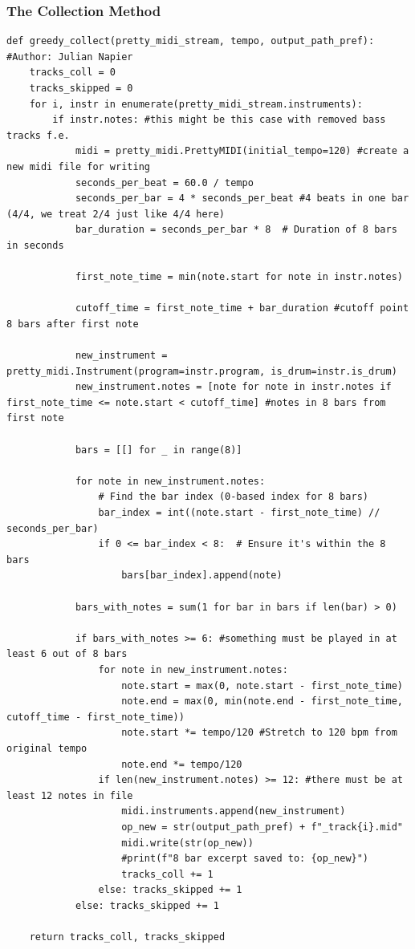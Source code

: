 \documentclass[a4paper,12pt]{extarticle}
\begin{document}
\subsubsection{The Collection Method}
\begin{lstlisting}
def greedy_collect(pretty_midi_stream, tempo, output_path_pref):
#Author: Julian Napier
    tracks_coll = 0
    tracks_skipped = 0
    for i, instr in enumerate(pretty_midi_stream.instruments):
        if instr.notes: #this might be this case with removed bass tracks f.e.
            midi = pretty_midi.PrettyMIDI(initial_tempo=120) #create a new midi file for writing
            seconds_per_beat = 60.0 / tempo
            seconds_per_bar = 4 * seconds_per_beat #4 beats in one bar (4/4, we treat 2/4 just like 4/4 here)
            bar_duration = seconds_per_bar * 8  # Duration of 8 bars in seconds

            first_note_time = min(note.start for note in instr.notes) 

            cutoff_time = first_note_time + bar_duration #cutoff point 8 bars after first note

            new_instrument = pretty_midi.Instrument(program=instr.program, is_drum=instr.is_drum)
            new_instrument.notes = [note for note in instr.notes if first_note_time <= note.start < cutoff_time] #notes in 8 bars from first note

            bars = [[] for _ in range(8)]

            for note in new_instrument.notes:
                # Find the bar index (0-based index for 8 bars)
                bar_index = int((note.start - first_note_time) // seconds_per_bar)
                if 0 <= bar_index < 8:  # Ensure it's within the 8 bars
                    bars[bar_index].append(note)

            bars_with_notes = sum(1 for bar in bars if len(bar) > 0)

            if bars_with_notes >= 6: #something must be played in at least 6 out of 8 bars
                for note in new_instrument.notes:
                    note.start = max(0, note.start - first_note_time)
                    note.end = max(0, min(note.end - first_note_time, cutoff_time - first_note_time))
                    note.start *= tempo/120 #Stretch to 120 bpm from original tempo
                    note.end *= tempo/120
                if len(new_instrument.notes) >= 12: #there must be at least 12 notes in file
                    midi.instruments.append(new_instrument)
                    op_new = str(output_path_pref) + f"_track{i}.mid"
                    midi.write(str(op_new))
                    #print(f"8 bar excerpt saved to: {op_new}")
                    tracks_coll += 1
                else: tracks_skipped += 1
            else: tracks_skipped += 1

    return tracks_coll, tracks_skipped
\end{lstlisting}
\end{document}
